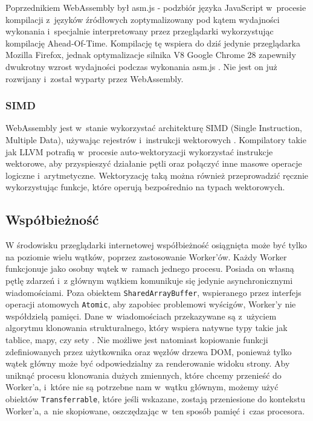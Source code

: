 Poprzednikiem WebAssembly był asm.js - podzbiór języka JavaScript w~procesie kompilacji z~języków źródłowych zoptymalizowany pod kątem wydajności wykonania i~specjalnie interpretowany przez przeglądarki wykorzystując kompilację Ahead-Of-Time. Kompilację tę wspiera do dziś jedynie przeglądarka Mozilla Firefox, jednak optymalizacje silnika V8 Google Chrome 28 zapewniły dwukrotny wzrost wydajności podczas wykonania asm.js \cite{asm.js-chrome}. Nie jest on już rozwijany i~został wyparty przez WebAssembly.

\subsubsection{SIMD}

WebAssembly jest w~stanie wykorzystać architekturę SIMD (Single Instruction, Multiple Data), używając rejestrów i~instrukcji wektorowych \cite{wasm-simd}. Kompilatory takie jak LLVM potrafią w~procesie auto-wektoryzacji wykorzystać instrukcje wektorowe, aby przyspieszyć działanie pętli oraz połączyć inne masowe operacje logiczne i~arytmetyczne. Wektoryzację taką można również przeprowadzić ręcznie wykorzystując funkcje, które operują bezpośrednio na typach wektorowych.

\subsection{Współbieżność}

W środowisku przeglądarki internetowej współbieżność osiągnięta może być tylko na poziomie wielu wątków, poprzez zastosowanie Worker'ów. Każdy Worker funkcjonuje jako osobny wątek w~ramach jednego procesu. Posiada on własną pętlę zdarzeń i~z głównym wątkiem komunikuje się jedynie asynchronicznymi wiadomościami. Poza obiektem \lstinline{SharedArrayBuffer}, wspieranego przez interfejs operacji atomowych \lstinline{Atomic}, aby zapobiec problemowi wyścigów, Worker'y nie współdzielą pamięci. Dane w~wiadomościach przekazywane są z~użyciem algorytmu klonowania strukturalnego, który wspiera natywne typy takie jak tablice, mapy, czy sety \cite{structured-clone}. Nie możliwe jest natomiast kopiowanie funkcji zdefiniowanych przez użytkownika oraz węzłów drzewa DOM, ponieważ tylko wątek główny może być odpowiedzialny za renderowanie widoku strony. Aby uniknąć procesu klonowania dużych zmiennych, które chcemy przenieść do Worker'a, i~które nie są potrzebne nam w~wątku głównym, możemy użyć obiektów \lstinline{Transferrable}, które jeśli wskazane, zostają przeniesione do kontekstu Worker'a, a~nie skopiowane, oszczędzając w~ten sposób pamięć i~czas procesora.

